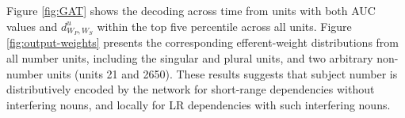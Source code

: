 Figure \ref{fig:GAT} shows the decoding across time from units with both AUC values and $d^u_{W_P, W_S}$ within the top five percentile across all units. Figure \ref{fig:output-weights} presents the corresponding efferent-weight distributions from all number units, including the singular and plural units, and two arbitrary non-number units (units \unit{2}{1} and \unit{2}{650}). These results suggests that subject number is distributively encoded by the network for short-range dependencies without interfering nouns, and locally for LR dependencies with such interfering nouns. 